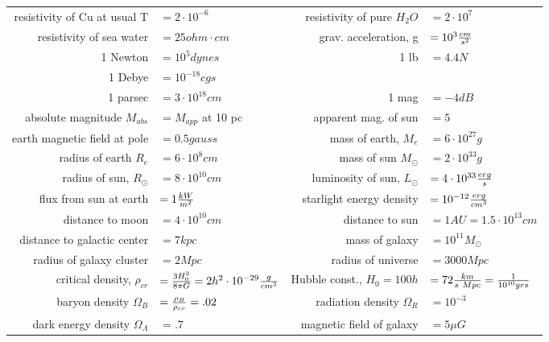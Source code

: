 \documentclass[10pt]{article}
\def\inv#1{{1\over #1}}
\def\e#1{\cdot10^{#1}}
\begin{document}
\begin{table}[h!]
\begin{tabular}{|rlrl|}
resistivity of Cu at usual T &
$=2\e{-6}$ &
resistivity of pure $H_2O$ &
$=2\e{7}$ \\

resistivity of sea water &
$=25 ohm\cdot cm$ &
grav. acceleration, g &
$=10^3{cm\over s^2}$ \\


1 Newton &
$=10^5 dynes $& 
1 lb &
$=4.4 N$ \\

1 Debye &
$=10^{-18} cgs$ &
&
\\

\hline

1 parsec &
$=3\e{18} cm$ &
1 mag &
$=-4dB$ \\

absolute magnitude $M_{abs}$ &
$=M_{app}$ at 10 pc &
apparent mag. of sun &
$=5$ \\

earth magnetic field at pole &
$=0.5 gauss$ &
mass of earth, $M_e$ &
$=6\e{27} g$ \\

radius of earth $R_e$ &
$=6\e{8} cm$ &
mass of sun $M_\odot$ &
$=2\e{33} g$ \\

radius of sun, $R_\odot$ &
$=8\e{10} cm$ &
luminosity of sun, $L_\odot$ &
$=4\e{33}{erg\over s}$ \\

flux from sun at earth &
$=1{kW\over m^2}$ &
starlight energy density &
$=10^{-12}{erg\over cm^3}$ \\

distance to moon &
$=4\e{10} cm$ &
distance to sun &
$=1 AU=1.5\e{13} cm$ \\

distance to galactic center &
$=7 kpc$ &
mass of galaxy &
$=10^{11} M_\odot$ \\

radius of galaxy cluster&
$=2 Mpc$ &
radius of universe &
$=3000 Mpc$ \\

critical density, $\rho_{cr}$&
$={3H_0^2\over 8\pi G}=2h^2\e{-29}{g\over cm^3}$ &
Hubble const., $H_0=100h$ &
$=72{km\over s\ Mpc}=\inv{10^{10}yrs}$ \\

baryon density $\Omega_B$ &
$={\rho_B\over\rho_{cr}}=.02$ &
radiation density $\Omega_R$ &
$=10^{-3}$ \\

dark energy density $\Omega_\Lambda$ &
$=.7$ &
magnetic field of galaxy &
$=5\mu G$\\

\hline
\end{tabular}\end{table}
\end{document}
